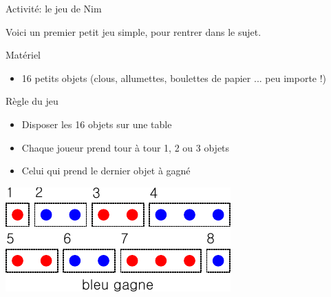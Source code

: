 \begin{frame}{Activité: le jeu de Nim}

  Voici un premier petit jeu simple, pour rentrer dans le sujet.

  \begin{block}{Matériel}
    \begin{itemize}
    \item 16 petits objets (clous, allumettes, boulettes de papier ... peu importe !)
    \end{itemize}
  \end{block}

  \begin{block}{Règle du jeu}
    \begin{itemize}
      \item Disposer les 16 objets sur une table
      \item Chaque joueur prend tour à tour 1, 2 ou 3 objets
      \item Celui qui prend le dernier objet à gagné
    \end{itemize}
  \end{block}

  \bigskip \bigskip  \bigskip \bigskip

  \begin{center}
    \includegraphics[width=0.8\linewidth]{img/nim.pdf}
  \end{center}

\end{frame}

